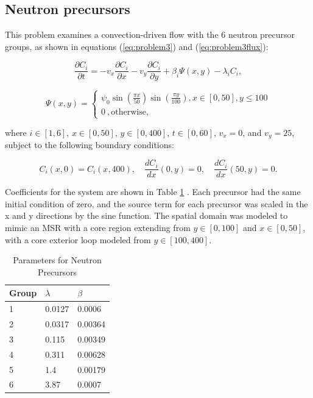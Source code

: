 \subsection{Neutron precursors}
This problem examines a convection-driven flow with the 6 neutron precursor groups, as shown in equations (\ref{eq:problem3}) and (\ref{eq:problem3flux}): 

\begin{equation}
\frac{\partial C_{i}}{\partial t} = -v_{x}\frac{\partial C_{i}}{\partial x} - v_{y}\frac{\partial C_{i}}{\partial y} + \beta_{i} \Psi (x, y) -\lambda_i C_{i},
\label{eq:problem3}
\end{equation}

\begin{equation}
\Psi (x, y) = \begin{cases}
  \psi _0 \sin\left(\frac{\pi x}{50}\right)\sin\left(\frac{\pi y}{100}\right) , x \in [0,50], y \le 100 \\
  0\ , \text{otherwise},
  \label{eq:problem3flux}
\end{cases}
\end{equation}

\noindent where $i \in [1,6]$, $x \in [0, 50]$, $y \in [0, 400]$, $t \in [0, 60]$, $v_{x} = 0$, and $v_{y} = 25$, subject to the following boundary conditions:

\begin{equation}
    C_{i}(x,0) = C_{i}(x,400), \quad \frac{dC_{i}}{dx}(0,y) = 0, \quad \frac{dC_{i}}{dx}(50, y) = 0.
\end{equation}

Coefficients for the system are shown in Table \ref{tab:precursorCoeffs} \cite{ott1985}. 
Each precursor had the same initial condition of zero, and the source term for each precursor was scaled in the x and y directions by the sine function. The spatial domain was modeled to mimic an MSR with a core region extending from $y \in [0,100]$ and $x \in [0,50]$, with a core exterior loop modeled from $y \in [100, 400]$. 

\begin{table}[h!]
   \caption{\label{tab:precursorCoeffs} Parameters for Neutron Precursors}
   \centering
   \begin{tabular}{lll}
   \hline
   Group & $\lambda$ & $\beta$ \\
   \hline
   1 & 0.0127 & 0.0006 \\
   2 & 0.0317 & 0.00364 \\
   3 & 0.115 & 0.00349 \\
   4 & 0.311& 0.00628 \\
   5 & 1.4 & 0.00179\\
   6 & 3.87 & 0.0007 \\
   \hline
   \end{tabular}
\end{table}     

